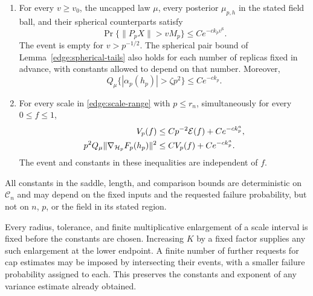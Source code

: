 \begin{proposition}
\begin{enumerate}
\item For every \(v\ge v_0\), the uncapped law \(\mu\), every posterior
 \(\mu_{p,h}\) in the stated field ball, and their spherical counterparts
 satisfy
 \begin{equation}\label{edge:projection-tails}
 \Pr\{\|P_pX\|>vM_p\}\le C e^{-c k_pv^6}.
 \end{equation}
 The event is empty for \(v>p^{-1/2}\).  The spherical pair bound of
 Lemma~\ref{edge:spherical-tails} also holds for each number of replicas
 fixed in advance, with constants allowed to depend on that number.  Moreover,
 \begin{equation}\label{edge:ordinary-annulus}
 Q_\mu\{|\alpha_p(h_p)|>\zeta p^2\}\le C e^{-c k_p}.
 \end{equation}

\item For every scale in \eqref{edge:scale-range} with \(p\le r_n\),
 simultaneously for every \(0\le f\le1\),
 \begin{equation}\label{edge:variance-estimates}
 \begin{split}
 V_p(f)&\le Cp^{-2}\mathcal E(f)+C e^{-c k_p^a},\\
 p^2Q_\mu\|\nabla_{\mathcal H_p}F_p(h_p)\|^2
       &\le C V_p(f)+C e^{-c k_p^a}.
 \end{split}
 \end{equation}
 The event and constants in these inequalities are independent of \(f\).
\end{enumerate}
All constants in the saddle, length, and comparison bounds are
deterministic on \(\mathcal C_n\) and may depend on the fixed inputs and
the requested failure probability, but not on \(n\), \(p\), or the field
in its stated region.
\end{proposition}

Every radius, tolerance, and finite multiplicative enlargement of a scale
interval is fixed before the constants are chosen.  Increasing \(K\) by a
fixed factor supplies any such enlargement at the lower endpoint.
A finite number of further requests for cap estimates may be imposed by
intersecting their events, with a smaller failure probability assigned to
each.  This preserves the constants and exponent of any variance estimate
already obtained.

